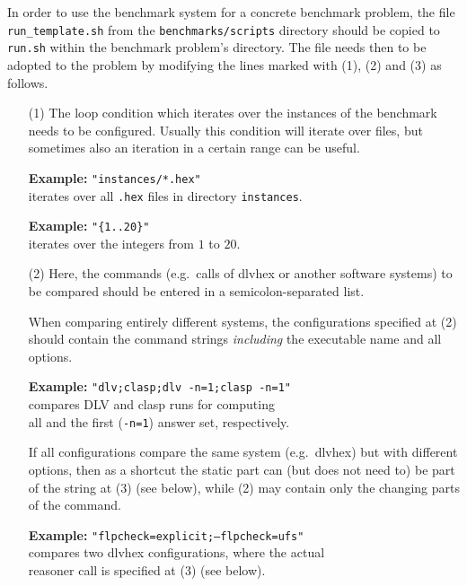 \documentclass[a4paper]{article}
\newcommand{\dlvhex}{{\sc dlvhex}}
\begin{document}
		In order to use the benchmark system for a concrete benchmark problem,
		the file {\tt run\_template.sh} from the {\tt benchmarks/scripts} directory
		should be copied to {\tt run.sh} within the benchmark problem's directory.
		The file needs then to be adopted to the problem by modifying the lines
		marked with (1), (2) and (3) as follows.
		\begin{enumerate}
		\item[(1)] The loop condition which iterates over the instances of the benchmark needs to be configured.
			Usually this condition will iterate over files, but sometimes also an iteration in a certain range can be useful.

			\begin{tabbing}
				\textbf{Example: } \= {\tt "instances/*.hex"} \\
				\> iterates over all {\tt .hex} files in directory {\tt instances}.
			\end{tabbing}

			\begin{tabbing}
				\textbf{Example: } \= {\tt "\{1..20\}"} \\
				\> iterates over the integers from $1$ to $20$.
			\end{tabbing}
		\item[(2)] Here, the commands (e.g.~calls of \dlvhex{} or another software systems) to be compared should be entered in a semicolon-separated list.

			When comparing entirely different systems,
			the configurations specified at (2) should contain the command strings \emph{including} the executable name and all options.

			\begin{tabbing}
				\textbf{Example: } \= {\tt "dlv;clasp;dlv -n=1;clasp -n=1"} \\
				\> compares {\sc DLV} and {\sc clasp} runs for computing \\
				\> all and the first ({\tt -n=1}) answer set, respectively.
			\end{tabbing}

			If all configurations compare the same system (e.g.~\dlvhex{}) but with different options,
			then as a shortcut the static part can (but does not need to) be part of the string at
			(3) (see below), while (2) may contain only the changing parts of the command.

			\begin{tabbing}
				\textbf{Example: } \= {\tt "flpcheck=explicit;--flpcheck=ufs"} \\
				\> compares two \dlvhex{} configurations, where the actual \\
				\> reasoner call is specified at (3) (see below).
			\end{tabbing}


\end{enumerate}
\end{document}
